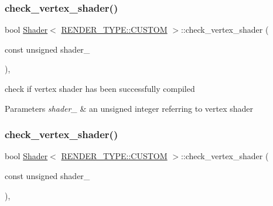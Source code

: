 \subsubsection{\texorpdfstring{check\+\_\+vertex\+\_\+shader()}{check\_vertex\_shader()}\hspace{0.1cm}{\footnotesize\ttfamily [1/2]}}
{\footnotesize\ttfamily bool \mbox{\hyperlink{classShader}{Shader}}$<$ \mbox{\hyperlink{shader__class_8hpp_a24e288e18eb7b6e01de7565001fedb60a72baef04098f035e8a320b03ad197818}{R\+E\+N\+D\+E\+R\+\_\+\+T\+Y\+P\+E\+::\+C\+U\+S\+T\+OM}} $>$\+::check\+\_\+vertex\+\_\+shader (\begin{DoxyParamCaption}\item[{const unsigned}]{shader\+\_\+ }\end{DoxyParamCaption})\hspace{0.3cm}{\ttfamily [inline]}, {\ttfamily [protected]}}



check if vertex shader has been successfully compiled 


\begin{DoxyParams}{Parameters}
{\em shader\+\_\+} & an unsigned integer referring to vertex shader \\
\hline
\end{DoxyParams}
\mbox{\label{classShader_3_01RENDER__TYPE_1_1CUSTOM_01_4_afca4ecec5bed3cf6a9f219ce52e5343e}} 
\subsubsection{\texorpdfstring{check\+\_\+vertex\+\_\+shader()}{check\_vertex\_shader()}\hspace{0.1cm}{\footnotesize\ttfamily [2/2]}}
{\footnotesize\ttfamily bool \mbox{\hyperlink{classShader}{Shader}}$<$ \mbox{\hyperlink{shader__class_8hpp_a24e288e18eb7b6e01de7565001fedb60a72baef04098f035e8a320b03ad197818}{R\+E\+N\+D\+E\+R\+\_\+\+T\+Y\+P\+E\+::\+C\+U\+S\+T\+OM}} $>$\+::check\+\_\+vertex\+\_\+shader (\begin{DoxyParamCaption}\item[{const unsigned}]{shader\+\_\+ }\end{DoxyParamCaption})\hspace{0.3cm}{\ttfamily [inline]}, {\ttfamily [protected]}}



